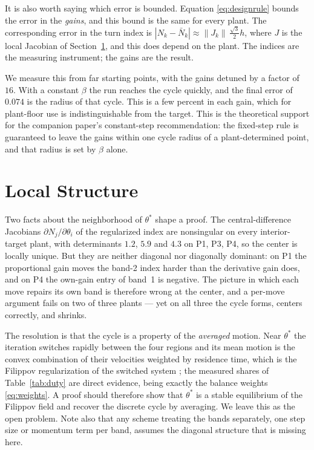 \documentclass[letterpaper, 10pt, conference, twocolumn]{ieeeconf}
\newcommand{\Nbar}{\bar{N}}
\begin{document}
It is also worth saying which error is bounded. Equation
\eqref{eq:designrule} bounds the error in the \emph{gains}, and this bound is
the same for every plant. The corresponding error in the turn index is
$|N_k - \Nbar_k| \approx \|J_k\| \, \tfrac{\sqrt{3}}{2} h$, where $J$ is the
local Jacobian of Section~\ref{sec:structure}, and this does depend on the
plant. The indices are the measuring instrument; the gains are the result.

We measure this from far starting points, with the gains detuned by a factor
of $16$. With a constant $\beta$ the run reaches the cycle quickly, and the
final error of $0.074$ is the radius of that cycle. This is a few percent in
each gain, which for
plant-floor use is indistinguishable from the target. This is the theoretical
support for the companion paper's constant-step recommendation: the fixed-step
rule is guaranteed to leave the gains within one cycle radius of a
plant-determined point, and that radius is set by $\beta$ alone.

\section{Local Structure}
\label{sec:structure}

Two facts about the neighborhood of $\theta^*$ shape a proof. The
central-difference Jacobians $\partial N_j/\partial\theta_i$ of the regularized
index are nonsingular on every interior-target plant, with determinants $1.2$,
$5.9$ and $4.3$ on P1, P3, P4, so the center is locally unique. But they are
neither diagonal nor diagonally dominant: on P1 the proportional gain moves the
band-2 index harder than the derivative gain does, and on P4 the own-gain entry
of band~1 is negative. The picture in which each move repairs its own band is
therefore wrong at the center, and a per-move argument fails on two of three
plants --- yet on all three the cycle forms, centers correctly, and shrinks.

The resolution is that the cycle is a property of the \emph{averaged} motion.
Near $\theta^*$ the iteration switches rapidly between the four regions and its
mean motion is the convex combination of their velocities weighted by residence
time, which is the Filippov regularization of the switched system
\cite{Filippov1988}; the measured shares of Table~\ref{tab:duty} are direct
evidence, being exactly the balance weights \eqref{eq:weights}. A proof should
therefore show that $\theta^*$ is a stable equilibrium of the Filippov field
and recover the discrete cycle by averaging. We leave this as the open problem.
Note also that any scheme treating the bands separately, one step size or
momentum term per band, assumes the diagonal structure that is missing here.
\end{document}
